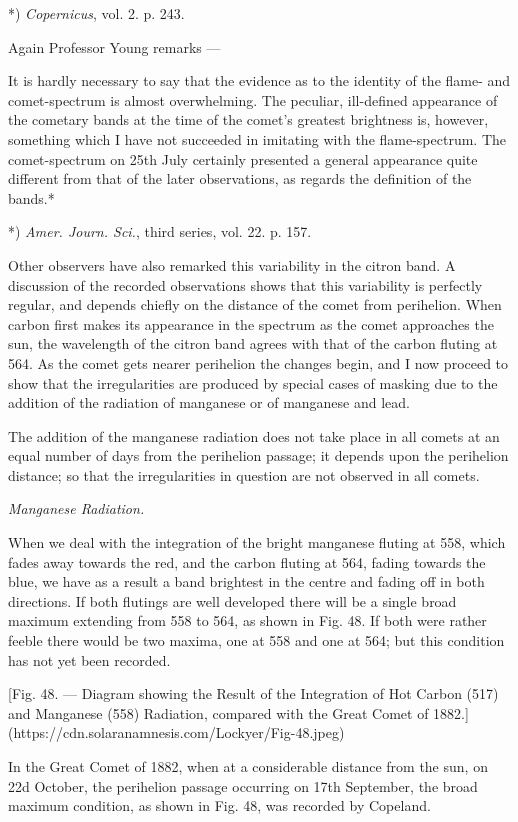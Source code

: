 \documentclass[a4paper, 12pt, oneside, polutonikogreek, english]{article}
\begin{document}
*) \emph{Copernicus}, vol. 2. p. 243.

Again Professor Young remarks ---

It is hardly necessary to say that the evidence as to the identity of the flame- and comet-spectrum is almost overwhelming. The peculiar, ill-defined appearance of the cometary bands at the time of the comet's greatest brightness is, however, something which I have not succeeded in imitating with the flame-spectrum. The comet-spectrum on 25th July certainly presented a general appearance quite different from that of the later observations, as regards the definition of the bands.*

*) \emph{Amer. Journ. Sci.}, third series, vol. 22. p. 157.

Other observers have also remarked this variability in the citron band. A discussion of the recorded observations shows that this variability is perfectly regular, and depends chiefly on the distance of the comet from perihelion. When carbon first makes its appearance in the spectrum as the comet approaches the sun, the wavelength of the citron band agrees with that of the carbon fluting at 564. As the comet gets nearer perihelion the changes begin, and I now proceed to show that the irregularities are produced by special cases of masking due to the addition of the radiation of manganese or of manganese and lead.

The addition of the manganese radiation does not take place in all comets at an equal number of days from the perihelion passage; it depends upon the perihelion distance; so that the irregularities in question are not observed in all comets.

\emph{Manganese Radiation.}

When we deal with the integration of the bright manganese fluting at 558, which fades away towards the red, and the carbon fluting at 564, fading towards the blue, we have as a result a band brightest in the centre and fading off in both directions. If both flutings are well developed there will be a single broad maximum extending from 558 to 564, as shown in Fig. 48. If both were rather feeble there would be two maxima, one at 558 and one at 564; but this condition has not yet been recorded.

[Fig. 48. --- Diagram showing the Result of the Integration of Hot Carbon (517) and Manganese (558) Radiation, compared with the Great Comet of 1882.](https://cdn.solaranamnesis.com/Lockyer/Fig-48.jpeg)

In the Great Comet of 1882, when at a considerable distance from the sun, on 22d October, the perihelion passage occurring on 17th September, the broad maximum condition, as shown in Fig. 48, was recorded by Copeland.
\end{document}
